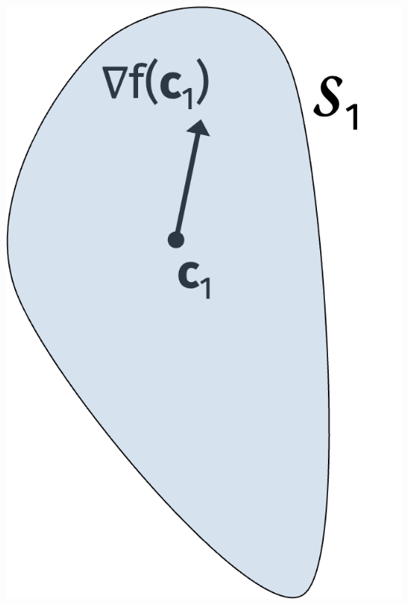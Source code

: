 \documentclass[compress]{beamer}
\begin{document}
\begin{frame}[t]
\begin{columns}
\begin{column}{.35\textwidth}
			\includegraphics[width=\textwidth]{cog2.png}
		\end{column}
	\end{columns}
\end{frame}
\end{document}
